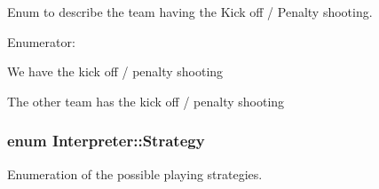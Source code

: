 Enum to describe the team having the Kick off / Penalty shooting. 

\begin{Desc}
\item[Enumerator: ]\par
\begin{description}
\item[{\em 
\hypertarget{classInterpreter_ac7c3ba77d973ffbb84b12db662cfe643a8c18a3c8b220a0c8166c1ee4b3504ebe}{
OUR\_\-TURN}
\label{classInterpreter_ac7c3ba77d973ffbb84b12db662cfe643a8c18a3c8b220a0c8166c1ee4b3504ebe}
}]We have the kick off / penalty shooting \item[{\em 
\hypertarget{classInterpreter_ac7c3ba77d973ffbb84b12db662cfe643ac196847925fbe4bc38ee72b9b97d0f76}{
THEIR\_\-TURN}
\label{classInterpreter_ac7c3ba77d973ffbb84b12db662cfe643ac196847925fbe4bc38ee72b9b97d0f76}
}]The other team has the kick off / penalty shooting \end{description}
\end{Desc}

\hypertarget{classInterpreter_a0fb49436c8c14ca79e13f1cd78119088}{
\subsubsection[{Strategy}]{\setlength{\rightskip}{0pt plus 5cm}enum {\bf Interpreter::Strategy}}}
\label{classInterpreter_a0fb49436c8c14ca79e13f1cd78119088}


Enumeration of the possible playing strategies. 

